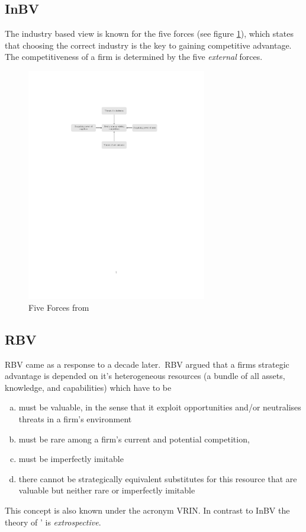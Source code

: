 \subsection{\gls{InBV}}
The industry based view is known for the five forces (see figure \ref{fig:5forces}), which states that choosing the correct industry is the key to gaining competitive advantage. The competitiveness of a firm is determined by the five \emph{external} forces.

\begin{figure}[htbp] 
	\centering
	\includegraphics[width=0.7\textwidth]{5forces}
 	\caption{Five Forces from \cite{Porter:1980}}
	\label{fig:5forces}
\end{figure}
\subsection{\gls{RBV}}

\Gls{RBV} came as a response to \cite{Porter:1980} a decade later.~\Gls{RBV} argued that a firms strategic advantage is depended on it's heterogeneous resources (a bundle of all assets, knowledge, and capabilities) which have to be
\begin{enumerate}[(a)]
\item must be valuable, in the sense that it exploit opportunities and/or neutralises threats in a firm’s environment
\item must be rare among a firm’s current and potential competition, 
\item must be imperfectly imitable
\item  there cannot be strategically equivalent substitutes for this resource that are valuable but neither rare or imperfectly imitable 
\end{enumerate} 
This concept is also known under the acronym VRIN. In contrast to \gls{InBV} the theory of '\cite{Barney:1991} is \emph{extrospective}. 
\\

